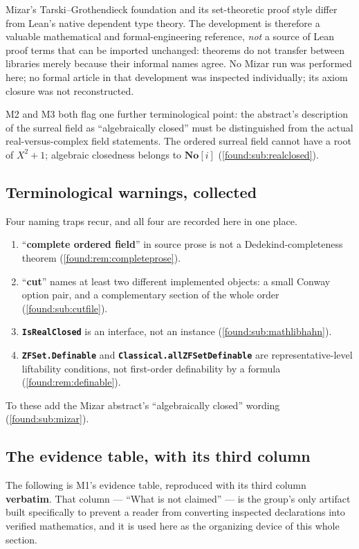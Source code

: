 \documentclass[11pt,letterpaper]{article}
\numberwithin{equation}{section}
\theoremstyle{definition}
\theoremstyle{remark}
\newcommand{\No}{\mathbf{No}}
\begin{document}
Mizar's Tarski--Grothendieck foundation and its set-theoretic proof style differ
from Lean's native dependent type theory. The development is therefore a
valuable mathematical and formal-engineering reference, \emph{not} a source of
Lean proof terms that can be imported unchanged: theorems do not transfer between
libraries merely because their informal names agree. No Mizar run was performed
here; no formal article in that development was inspected individually; its axiom
closure was not reconstructed.

M2 and M3 both flag one further terminological point: the abstract's description
of the surreal field as ``algebraically closed'' must be distinguished from the
actual real-versus-complex field statements. The ordered surreal field cannot
have a root of $X^2+1$; algebraic closedness belongs to $\No[i]$
(\cref{found:sub:realclosed}).

\subsection{Terminological warnings, collected}
\label{found:sub:terminology}
Four naming traps recur, and all four are recorded here in one place.
\begin{enumerate}
\item ``\textbf{complete ordered field}'' in source prose is not a
Dedekind-completeness theorem (\cref{found:rem:completeprose}).
\item ``\textbf{cut}'' names at least two different implemented objects: a small
Conway option pair, and a complementary section of the whole order
(\cref{found:sub:cutfile}).
\item \texttt{\textbf{IsRealClosed}} is an interface, not an instance
(\cref{found:sub:mathlibhahn}).
\item \texttt{\textbf{ZFSet.Definable}} and
\texttt{\textbf{Classical.allZFSetDefinable}} are representative-level
liftability conditions, not first-order definability by a formula
(\cref{found:rem:definable}).
\end{enumerate}
To these add the Mizar abstract's ``algebraically closed'' wording
(\cref{found:sub:mizar}).

\subsection{The evidence table, with its third column}
\label{found:sub:evidencetable}
The following is M1's evidence table, reproduced with its third column
\textbf{verbatim}. That column --- ``What is not claimed'' --- is the group's
only artifact built specifically to prevent a reader from converting inspected
declarations into verified mathematics, and it is used here as the organizing
device of this whole section.
\end{document}
